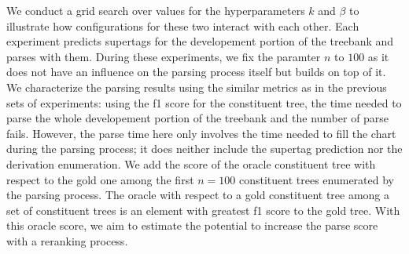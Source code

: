 \documentclass[../../document.tex]{subfiles}
\begin{document}
    We conduct a grid search over values for the hyperparameters \(k\) and \(\beta\) to illustrate how configurations for these two interact with each other.
    Each experiment predicts supertags for the developement portion of the treebank and parses with them.
    During these experiments, we fix the paramter \(n\) to \(100\) as it does not have an influence on the parsing process itself but builds on top of it.
    We characterize the parsing results using the similar metrics as in the previous sets of experiments: using the f1 score for the constituent tree, the time needed to parse the whole developement portion of the treebank and the number of parse fails.
    However, the parse time here only involves the time needed to fill the chart during the parsing process; it does neither include the supertag prediction nor the derivation enumeration.
    We add the score of the oracle constituent tree with respect to the gold one among the first \(n=100\) constituent trees enumerated by the parsing process.
    The oracle with respect to a gold constituent tree among a set of constituent trees is an element with greatest f1 score to the gold tree.
    With this oracle score, we aim to estimate the potential to increase the parse score with a reranking process.
\end{document}
